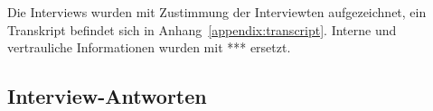 Die Interviews wurden mit Zustimmung der Interviewten aufgezeichnet, ein Transkript befindet sich in Anhang~\ref{appendix:transcript}.
Interne und vertrauliche Informationen wurden mit *** ersetzt.

\subsection{Interview-Antworten}
